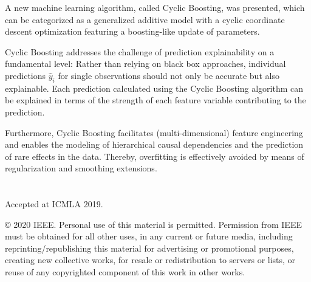 \documentclass[BCOR=1mm, DIV=calc,10pt,
twoside=true,
twocolumn,
headings=normal]{scrartcl}
\begin{document}
A new machine learning algorithm, called Cyclic Boosting, was presented, which can be
categorized as a generalized additive model with a cyclic coordinate descent optimization
featuring a boosting-like update of parameters.

Cyclic Boosting addresses the challenge of prediction explainability on a fundamental
level: Rather than relying on black box approaches, individual predictions $\hat{y}_i$
for single observations should not only be accurate but also explainable. Each prediction
calculated using the Cyclic Boosting algorithm can be explained in terms of the strength
of each feature variable contributing to the prediction.

Furthermore, Cyclic Boosting facilitates (multi-dimensional) feature engineering and
enables the modeling of hierarchical causal dependencies and the prediction of rare
effects in the data. Thereby, overfitting is effectively avoided by means of
regularization and smoothing extensions.

\section*{}
Accepted at ICMLA 2019.

\noindent
© 2020 IEEE. Personal use of this material is permitted. Permission from IEEE must be obtained for all other uses, in any current or future media, including reprinting/republishing this material for advertising or promotional purposes, creating new collective works, for resale or redistribution to servers or lists, or reuse of any copyrighted component of this work in other works. 



\end{document}
